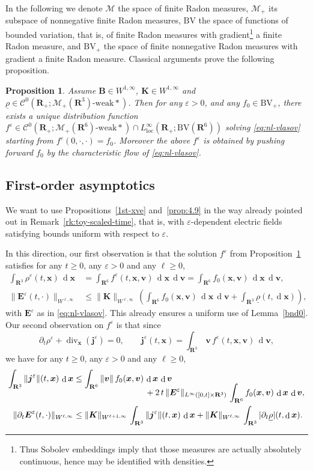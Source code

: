 \documentclass[10pt]{amsart}
\let\mathcal\mathscr
\newcommand{\BV}{\mathrm{BV}}
\let\eps\varepsilon
\let\d\partial
\DeclareMathOperator\dD{d}\let\dd\dD
\DeclareMathOperator{\Div}{div}
\theoremstyle{plain}
\newtheorem{proposition}[theorem]{Proposition}
\theoremstyle{definition}
\newcommand{\bpr}{\begin{proposition}}
\newcommand{\epr}{\end{proposition}}
\newcommand\R{\mathbf R}
\newcommand\bB{{\boldsymbol B}}
\newcommand\bE{{\boldsymbol E}}
\newcommand\bK{{\boldsymbol K}}
\newcommand\bfj{{\boldsymbol j}}
\newcommand\bfv{{\boldsymbol v}}
\newcommand\bfx{{\boldsymbol x}}
\newcommand\urho{{\underline \rho}}
\newcommand\cC{{\mathcal C}}
\newcommand\cM{{\mathcal M}}
\begin{document}
In the following we denote $\cM$ the space of finite Radon measures, $\cM_+$ its subspace of nonnegative finite Radon measures, $\BV$ the space of functions of bounded variation, that is, of finite Radon measures with gradient\footnote{Thus Sobolev embeddings imply that those measures are actually absolutely continuous, hence may be identified with densities.} a finite Radon measure, and $\BV_+$ the space of finite nonnegative Radon measures with gradient a finite Radon measure. Classical arguments prove the following proposition.

\bpr
\label{p:WP-nl}
Assume $\bB\!\in\!W^{1,\infty}$, $\bK\!\in\!W^{1,\infty}$ and $\urho\!\in\!\cC^0(\R_+;\cM_+(\R^3)\text{-weak}*)$. Then for any $\eps>0$, and any $f_0\in \BV_+$, there exists a unique distribution function $f^\eps\in\cC^0(\R_+;\cM_+(\R^6)\text{-weak}*)\cap L^\infty_\mathrm{loc}(\R_+;\BV(\R^6))$ solving \eqref{eq:nl-vlasov} starting from $f^\eps(0,\cdot,\cdot)=f_0$. Moreover the above $f^\eps$ is obtained by pushing forward $f_0$ by the characteristic flow of \eqref{eq:nl-vlasov}.
\epr

\subsection{First-order asymptotics}\label{s:1st-nl}

We want to use Propositions~\ref{1st-xve} and~\ref{prop:4.9} in the way already pointed out in Remark~\ref{rk:toy-scaled-time}, that is, with $\eps$-dependent electric fields satisfying bounds uniform with respect to $\eps$.

In this direction, our first observation is that the solution $f^\eps$ from Proposition~\ref{p:WP-nl} satisfies for any $t\geq0$, any $\eps>0$ and any $\ell\geq0$,
\begin{align*}
\int_{\R^3}\rho^\eps(t,\bfx)\,\dD \bfx
&=\int_{\R^6}f^\eps(t,\bfx,\bfv)\,\dD \bfx\,\dD \bfv
=\int_{\R^6}f_0(\bfx,\bfv)\,\dD \bfx\,\dD \bfv,\\
\|\bE^\eps(t,\cdot)\|_{W^{\ell,\infty}}
&\leq \|\bK\|_{W^{\ell,\infty}}\,(\int_{\R^6}f_0(\bfx,\bfv)\,\dD \bfx\,\dD \bfv+
\int_{\R^3}\urho(t,\dD \bfx)),
\end{align*}
with $\bE^\eps$ as in \eqref{eq:nl-vlasov}. This already ensures a uniform use of Lemma~\ref{bnd0}. Our second observation on $f^\eps$ is that since
\[
\d_t \rho^\eps+\Div_\bfx(\bfj^\eps)=0,\qquad
\bfj^\eps(t,\bfx)=\int_{\R^3}\,\bfv\,f^\eps(t,\bfx,\bfv)\,\dD \bfv,
\]
we have for any $t\geq0$, any $\eps>0$ and any $\ell\geq0$,
\begin{align*}
\int_{\R^3}\|\bfj^\eps\|(t,\bfx)\,\dD \bfx
&\leq \int_{\R^6}\|\bfv\|\,f_0(\bfx,\bfv)\,\dD \bfx\,\dD \bfv\\[-10pt]
&\hspace*{3cm}+2\,t\,\|\bE^\eps\|_{L^\infty([0,t]\times\R^3)}\,\int_{\R^6}f_0(\bfx,\bfv)\,\dD \bfx\,\dD \bfv,\\
\|\d_t\bE^\eps(t,\cdot)\|_{W^{\ell,\infty}}
&\leq
\|\bK\|_{W^{\ell+1,\infty}}\,\int_{\R^3}\|\bfj^\eps\|(t,\bfx)\,\dD \bfx+
\|\bK\|_{W^{\ell,\infty}}\,\int_{\R^3}|\d_t\urho|(t,\dD \bfx).
\end{align*}
\end{document}
